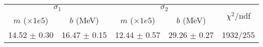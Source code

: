 \begin{tabular}{cc|cc||c}
\multicolumn{2}{c|}{$\sigma_1$} & \multicolumn{2}{|c}{$\sigma_2$}  & \multirow{2}{*}{$\chi^2/$ndf}\\
$m$ ($\times1e5$) & $b$ (MeV) & $m$ ($\times1e5$) & $b$ (MeV)  & \\
\hline
14.52 $\pm$ 0.30 & 16.47 $\pm$ 0.15 & 12.44 $\pm$ 0.57 & 29.26 $\pm$ 0.27 & 1932/255\\
\end{tabular}
